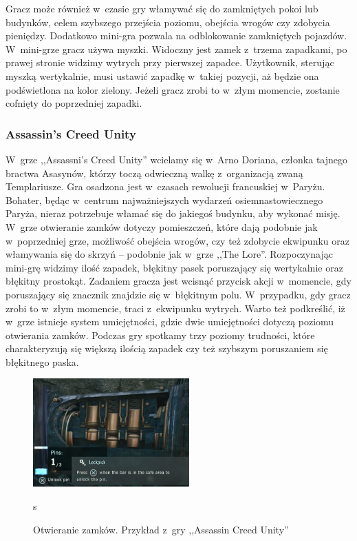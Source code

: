 \documentclass[oneside,polski,logo]{amuthesis}
\begin{document}
Gracz może również w~czasie gry włamywać się do zamkniętych pokoi lub budynków, celem szybszego przejścia poziomu, obejścia wrogów czy zdobycia pieniędzy. Dodatkowo mini-gra pozwala na odblokowanie zamkniętych pojazdów. W~mini-grze gracz używa myszki. Widoczny jest zamek z~trzema zapadkami, po prawej stronie widzimy wytrych przy pierwszej zapadce. Użytkownik, sterując myszką wertykalnie, musi ustawić zapadkę w~takiej pozycji, aż będzie ona podświetlona na kolor zielony. Jeżeli gracz zrobi to w~złym momencie, zostanie cofnięty do poprzedniej zapadki. \cite{Mafia2}

\subsubsection{Assassin's Creed Unity}
\par W~grze ,,Assassni's Creed Unity'' wcielamy się w~Arno Doriana, członka tajnego bractwa Asasynów, którzy toczą odwieczną walkę z~organizacją zwaną Templariusze. Gra osadzona jest w~czasach rewolucji francuskiej w~Paryżu. Bohater, będąc w~centrum najważniejszych wydarzeń osiemnastowiecznego Paryża, nieraz potrzebuje włamać się do jakiegoś budynku, aby wykonać misję. W~grze otwieranie zamków dotyczy pomieszczeń, które dają podobnie jak w~poprzedniej grze, możliwość obejścia wrogów, czy też zdobycie ekwipunku oraz włamywania się do skrzyń – podobnie jak w~grze ,,The Lore''. Rozpoczynając mini-grę widzimy ilość zapadek, błękitny pasek poruszający się wertykalnie oraz błękitny prostokąt. Zadaniem gracza jest wcisnąć przycisk akcji w~momencie, gdy poruszający się znacznik znajdzie się w~błękitnym polu. W~przypadku, gdy gracz zrobi to w~złym momencie, traci z~ekwipunku wytrych. Warto też podkreślić, iż w~grze istnieje system umiejętności, gdzie dwie umiejętności dotyczą poziomu otwierania zamków. Podczas gry spotkamy trzy poziomy trudności, które charakteryzują się większą ilością zapadek czy też szybszym poruszaniem się błękitnego paska. \cite{acu}
\begin{figure}[h]
	\centering
	\includegraphics[width=6cm]{images/tyrek/acu.png}
	\caption{Otwieranie zamków. Przykład z~gry ,,Assassin Creed Unity''}s
	\end{figure}
\end{document}
